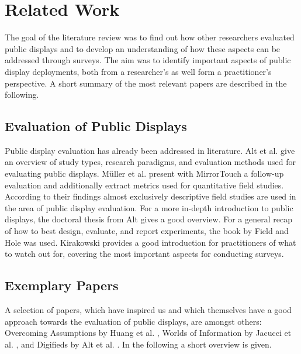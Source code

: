 \section{Related Work}
\label{chapter:related-work}

	The goal of the literature review was to find out how other researchers evaluated public displays and to develop an understanding of how these aspects can be addressed through surveys. The aim was to identify important aspects of public display deployments, both from a researcher's as well form a practitioner's perspective. A short summary of the most relevant papers are described in the following.


	\subsection{Evaluation of Public Displays} %

	Public display evaluation has already been addressed in literature. Alt et al. \cite{Alt2012HowToEvaluate} give an overview of study types, research paradigms, and evaluation methods used for evaluating public displays. M{\"u}ller et al. \cite{muller2014mirrortouch} present with MirrorTouch a follow-up evaluation and additionally extract metrics used for quantitative field studies. According to their findings almost exclusively descriptive field studies are used in the area of public display evaluation. For a more in-depth introduction to public displays, the doctoral thesis from Alt \cite{alt2013thesis} gives a good overview.
	For a general recap of how to best design, evaluate, and report experiments, the book by Field and Hole \cite{field2003design} was used. Kirakowski \cite{kirakowski2000questionnaireFAQ} provides a good introduction for practitioners of what to watch out for, covering the most important aspects for conducting surveys.




	\subsection{Exemplary Papers}

	A selection of papers, which have inspired us and which themselves have a good approach towards the evaluation of public displays, are amongst others: Overcoming Assumptions by Huang et al. \cite{huang2008overcoming}, Worlds of Information by Jacucci et al. \cite{jacucci2010worldsofinformation}, and Digifieds by Alt et al. \cite{alt2011digifieds}. In the following a short overview is given.


